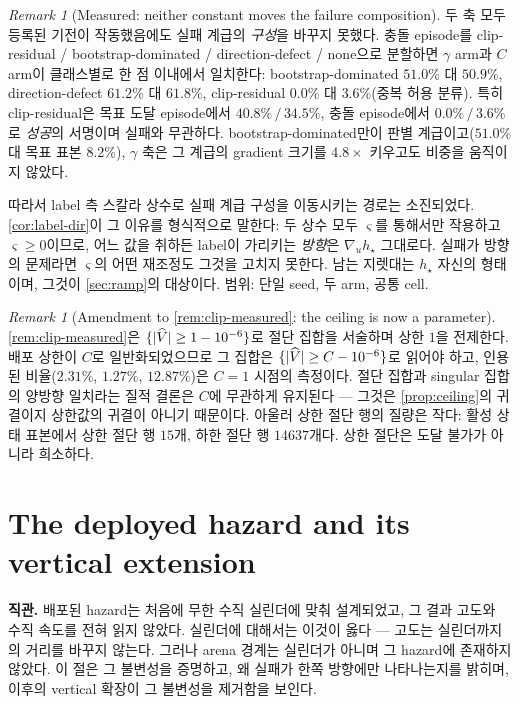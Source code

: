 \documentclass[11pt]{article}
\theoremstyle{plain}
\theoremstyle{definition}
\theoremstyle{remark}
\newtheorem{remark}[theorem]{Remark}
\DeclarePairedDelimiter{\abs}{\lvert}{\rvert}
\newcommand{\Vhat}{\widehat V}
\newcommand{\grad}{\nabla}
\begin{document}
\begin{remark}[Measured: neither constant moves the failure composition]\label{rem:CG-limit}
두 축 모두 등록된 기전이 작동했음에도 실패 계급의 \emph{구성}을 바꾸지 못했다. 충돌 episode를
clip-residual / bootstrap-dominated / direction-defect / none으로 분할하면 $\gamma$ arm과 $C$ arm이
클래스별로 한 점 이내에서 일치한다: bootstrap-dominated $51.0\%$ 대 $50.9\%$, direction-defect
$61.2\%$ 대 $61.8\%$, clip-residual $0.0\%$ 대 $3.6\%$(중복 허용 분류). 특히 clip-residual은 목표
도달 episode에서 $40.8\%\,/\,34.5\%$, 충돌 episode에서 $0.0\%\,/\,3.6\%$로 \emph{성공}의 서명이며
실패와 무관하다. bootstrap-dominated만이 판별 계급이고($51.0\%$ 대 목표 표본 $8.2\%$), $\gamma$
축은 그 계급의 gradient 크기를 $4.8\times$ 키우고도 비중을 움직이지 않았다.

따라서 label 측 스칼라 상수로 실패 계급 구성을 이동시키는 경로는 소진되었다. \cref{cor:label-dir}이
그 이유를 형식적으로 말한다: 두 상수 모두 $\varsigma$를 통해서만 작용하고 $\varsigma\ge0$이므로,
어느 값을 취하든 label이 가리키는 \emph{방향}은 $\grad_u h_\star$ 그대로다. 실패가 방향의 문제라면
$\varsigma$의 어떤 재조정도 그것을 고치지 못한다. 남는 지렛대는 $h_\star$ 자신의 형태이며, 그것이
\cref{sec:ramp}의 대상이다. 범위: 단일 seed, 두 arm, 공통 cell.
\end{remark}

\begin{remark}[Amendment to \cref{rem:clip-measured}: the ceiling is now a parameter]\label{rem:clip-amend}
\cref{rem:clip-measured}은 $\{\abs{\Vhat}\ge1-10^{-6}\}$로 절단 집합을 서술하며 상한 $1$을
전제한다. 배포 상한이 $C$로 일반화되었으므로 그 집합은 $\{\abs{\Vhat}\ge C-10^{-6}\}$로 읽어야
하고, 인용된 비율($2.31\%$, $1.27\%$, $12.87\%$)은 $C=1$ 시점의 측정이다. 절단 집합과 singular
집합의 양방향 일치라는 질적 결론은 $C$에 무관하게 유지된다 --- 그것은 \cref{prop:ceiling}의
귀결이지 상한값의 귀결이 아니기 때문이다. 아울러 상한 절단 행의 질량은 작다: 활성 상태 표본에서
상한 절단 행 $15$개, 하한 절단 행 $14637$개다. 상한 절단은 도달 불가가 아니라 희소하다.
\end{remark}

\section{The deployed hazard and its vertical extension}\label{sec:vert}

\textbf{직관.} 배포된 hazard는 처음에 무한 수직 실린더에 맞춰 설계되었고, 그 결과 고도와 수직
속도를 전혀 읽지 않았다. 실린더에 대해서는 이것이 옳다 --- 고도는 실린더까지의 거리를 바꾸지
않는다. 그러나 arena 경계는 실린더가 아니며 그 hazard에 존재하지 않았다. 이 절은 그 불변성을
증명하고, 왜 실패가 한쪽 방향에만 나타나는지를 밝히며, 이후의 vertical 확장이 그 불변성을 제거함을
보인다.
\end{document}
